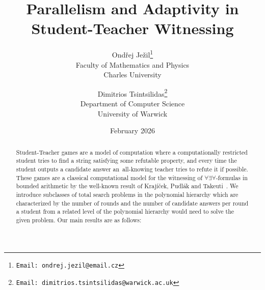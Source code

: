 \documentclass[11pt]{article}
\title{Parallelism and Adaptivity in Student-Teacher Witnessing}
\author{\large Ondřej Ježil\thanks{\texttt{Email: ondrej.jezil@email.cz}} \\ \small Faculty of Mathematics and Physics\\\small Charles University \and \large Dimitrios Tsintsilidas\thanks{\texttt{Email: dimitrios.tsintsilidas@warwick.ac.uk}}\\  \small Department of Computer Science\\ \small University of Warwick}
\date{February 2026}
\theoremstyle{definition}
\theoremstyle{definition}
\theoremstyle{remark}
\begin{document}
\maketitle
\vspace{-0.6cm}

\begin{abstract}
Student-Teacher games are a model of computation where a computationally restricted student tries to find a string satisfying some refutable property, and every time the student outputs a candidate answer an~all-knowing teacher tries to refute it if possible. These games are a classical computational model for  the witnessing of $\forall\exists\forall$-formulas in bounded arithmetic by the well-known result of Krajíček, Pudlák and Takeuti~\cite{KrajicekPT91}. We introduce subclasses of total search problems in the polynomial hierarchy which are characterized by the number of rounds and the number of candidate answers per round a student from a related level of the polynomial hierarchy would need to solve the given problem.  Our main results are as follows: 


\end{abstract}
\end{document}
